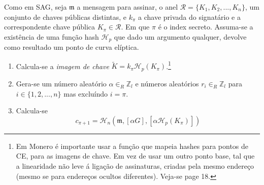 \begin{description}
Como em SAG, seja \(\mathfrak{m}\) a mensagem para assinar, o anel \(\mathcal{R} = \{K_1, K_2, ..., K_n\}\), um conjunto de chaves públicas distintas, e \(k_\pi\) a chave privada do signatário e a correspondente chave pública \(K_\pi \in \mathcal{R}\). Em que $\pi$ é o index secreto. Assuma-se a existência de uma função hash \(\mathcal{H}_p\) que dado um argumento qualquer, devolve como resultado um ponto de curva elíptica.
 

\begin{enumerate}
	\item Calcula-se a {\em imagem de chave} \(\tilde{K} = k_\pi \mathcal{H}_p(K_\pi)\).\footnote{Em Monero é importante usar a função que mapeia hashes para pontos de CE, para as imagens de chave. Em vez de usar um outro ponto base, tal que a linearidade não leve á ligação de assinaturas, criadas pela mesmo endereço (mesmo se para endereços ocultos diferentes). Veja-se \cite{cryptoNoteWhitePaper} page 18.} 

	\item Gera-se um número aleatório \(\alpha \in_R \mathbb{Z}_l\) e números aleatórios \(r_i \in_R \mathbb{Z}_l\) para \(i \in \{1, 2, ..., n\}\) mas excluíndo \(i = \pi\).

	\item Calcula-se
	\[c_{\pi+1} = \mathcal{H}_n(\mathfrak{m}, [\alpha G], [\alpha \mathcal{H}_p(K_\pi)])\]


\end{enumerate}
\end{description}
